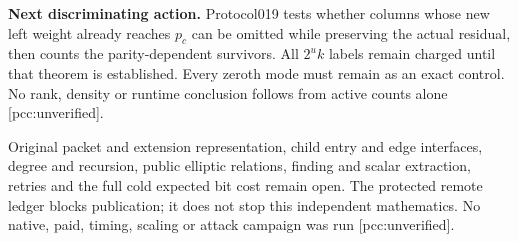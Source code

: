 \documentclass[10pt]{article}
\begin{document}
\textbf{Next discriminating action.} Protocol019 tests whether columns
whose new left weight already reaches $p_c$ can be omitted while preserving
the actual residual, then counts the parity-dependent survivors. All
$2^u k$ labels remain charged until that theorem is established. Every
zeroth mode must remain as an exact control. No rank, density or runtime
conclusion follows from active counts alone [pcc:unverified].

Original packet and extension representation, child entry and edge
interfaces, degree and recursion, public elliptic relations, finding and
scalar extraction, retries and the full cold expected bit cost remain open.
The protected remote ledger blocks publication; it does not stop this
independent mathematics. No native, paid, timing, scaling or attack campaign
was run [pcc:unverified].
\end{document}
